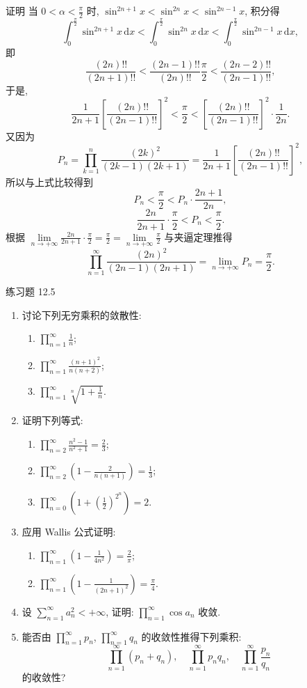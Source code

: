 证明 当 $0<\alpha<\frac{\pi}{2}$ 时, $\sin^{2n+1}x<\sin^{2n}x<\sin^{2n-1}x$, 积分得
\[
  \int_{0}^{\frac{\pi}{2}}\sin^{2n+1}x\,\mathrm{d}x<\int_{0}^{\frac{\pi}{2}}\sin^{2n}x\,\mathrm{d}x<\int_{0}^{\frac{\pi}{2}}\sin^{2n-1}x\,\mathrm{d}x,
\]
即
\[
  \frac{(2n)!!}{(2n+1)!!}<\frac{(2n-1)!!}{(2n)!!}\frac{\pi}{2}<\frac{(2n-2)!!}{(2n-1)!!},
\]
于是,
\[
  \frac{1}{2n+1}\left[\frac{(2n)!!}{(2n-1)!!}\right]^{2}<\frac{\pi}{2}<\left[\frac{(2n)!!}{(2n-1)!!}\right]^{2}\cdot\frac{1}{2n}.
\]
又因为
\[
  P_{n}=\prod_{k=1}^{n}\frac{(2k)^{2}}{(2k-1)(2k+1)}=\frac{1}{2n+1}\left[\frac{(2n)!!}{(2n-1)!!}\right]^{2},
\]
所以与上式比较得到
\[
  P_{n}<\frac{\pi}{2}<P_{n}\cdot\frac{2n+1}{2n},
\]
\[
  \frac{2n}{2n+1}\cdot\frac{\pi}{2}<P_{n}<\frac{\pi}{2}.
\]
根据 $\lim\limits_{n\to+\infty}\frac{2n}{2n+1}\cdot\frac{\pi}{2}=\frac{\pi}{2}=\lim\limits_{n\to+\infty}\frac{\pi}{2}$ 与夹逼定理推得
\[
  \prod_{n=1}^{\infty}\frac{(2n)^{2}}{(2n-1)(2n+1)}=\lim_{n\to+\infty}P_{n}=\frac{\pi}{2}.
\]

\begin{exblock}{练习题 12.5}
\begin{enumerate}
  \item 讨论下列无穷乘积的敛散性:
  \begin{enumerate}
    \item $\displaystyle\prod_{n=1}^{\infty}\frac{1}{n}$;
    \item $\displaystyle\prod_{n=1}^{\infty}\frac{(n+1)^{2}}{n(n+2)}$;
    \item $\displaystyle\prod_{n=1}^{\infty}\sqrt[n]{1+\frac{1}{n}}$.
  \end{enumerate}
  \item 证明下列等式:
  \begin{enumerate}
    \item $\displaystyle\prod_{n=2}^{\infty}\frac{n^{2}-1}{n^{2}+1}=\frac{2}{3}$;
    \item $\displaystyle\prod_{n=2}^{\infty}\left(1-\frac{2}{n(n+1)}\right)=\frac{1}{3}$;
    \item $\displaystyle\prod_{n=0}^{\infty}\left(1+\left(\frac{1}{2}\right)^{2^{n}}\right)=2$.
  \end{enumerate}
  \item 应用 Wallis 公式证明:
  \begin{enumerate}
    \item $\displaystyle\prod_{n=1}^{\infty}\left(1-\frac{1}{4n^{2}}\right)=\frac{2}{\pi}$;
    \item $\displaystyle\prod_{n=1}^{\infty}\left(1-\frac{1}{(2n+1)^{2}}\right)=\frac{\pi}{4}$.
  \end{enumerate}
  \item 设 $\sum_{n=1}^{\infty}a_{n}^{2}<+\infty$, 证明: $\prod_{n=1}^{\infty}\cos a_{n}$ 收敛.
  \item 能否由 $\prod_{n=1}^{\infty}p_{n}$, $\prod_{n=1}^{\infty}q_{n}$ 的收敛性推得下列乘积:
  \[
    \prod_{n=1}^{\infty}(p_{n}+q_{n}),\quad\prod_{n=1}^{\infty}p_{n}q_{n},\quad\prod_{n=1}^{\infty}\frac{p_{n}}{q_{n}}
\]
  的收敛性?
\end{enumerate}
\end{exblock}


